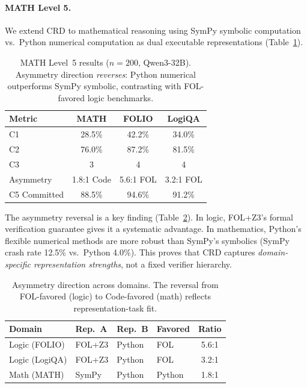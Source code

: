 \documentclass[11pt,a4paper]{article}
\begin{document}
\paragraph{MATH Level 5.} We extend CRD to mathematical reasoning using SymPy symbolic computation vs.\ Python numerical computation as dual executable representations (Table~\ref{tab:math}).

\begin{table}[t]
\centering
\small
\begin{tabular}{lccc}
\toprule
\textbf{Metric} & \textbf{MATH} & \textbf{FOLIO} & \textbf{LogiQA} \\
\midrule
C1 & 28.5\% & 42.2\% & 34.0\% \\
C2 & 76.0\% & 87.2\% & 81.5\% \\
C3 & 3 & 4 & 4 \\
Asymmetry & 1.8:1 Code & 5.6:1 FOL & 3.2:1 FOL \\
C5 Committed & 88.5\% & 94.6\% & 91.2\% \\
\bottomrule
\end{tabular}
\caption{MATH Level~5 results ($n\!=\!200$, Qwen3-32B). Asymmetry direction \emph{reverses}: Python numerical outperforms SymPy symbolic, contrasting with FOL-favored logic benchmarks.}
\label{tab:math}
\end{table}

The asymmetry reversal is a key finding (Table~\ref{tab:asymmetry_direction}). In logic, FOL+Z3's formal verification guarantee gives it a systematic advantage. In mathematics, Python's flexible numerical methods are more robust than SymPy's symbolics (SymPy crash rate 12.5\% vs.\ Python 4.0\%). This proves that CRD captures \emph{domain-specific representation strengths}, not a fixed verifier hierarchy.

\begin{table}[t]
\centering
\small
\begin{tabular}{llllc}
\toprule
\textbf{Domain} & \textbf{Rep.\ A} & \textbf{Rep.\ B} & \textbf{Favored} & \textbf{Ratio} \\
\midrule
Logic (FOLIO) & FOL+Z3 & Python & FOL & 5.6:1 \\
Logic (LogiQA) & FOL+Z3 & Python & FOL & 3.2:1 \\
Math (MATH) & SymPy & Python & Python & 1.8:1 \\
\bottomrule
\end{tabular}
\caption{Asymmetry direction across domains. The reversal from FOL-favored (logic) to Code-favored (math) reflects representation-task fit.}
\label{tab:asymmetry_direction}
\end{table}
\end{document}
